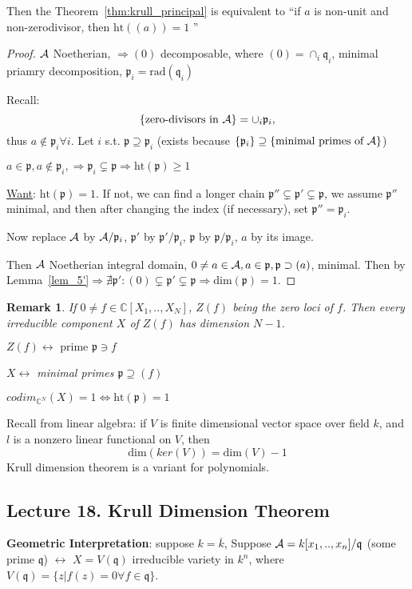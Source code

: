 \documentclass[11pt]{article}
\newtheorem{rmk}[thm]{Remark}
\newcommand{\cplx}{\mathbb C}
\newcommand{\scp}{{\mathfrak p}}
\newcommand{\scq}{\mathfrak q}
\newcommand{\cala}{{\cal A}}
\newcommand{\Lrta}{\Longrightarrow}
\newcommand{\llrta}{\longleftrightarrow}
\newcommand{\Llrta}{\Longleftrightarrow}
\begin{document}
Then the Theorem~\ref{thm:krull_principal} is equivalent to 
``if $a$ is non-unit and non-zerodivisor, then $\text{ht}((a))=1$ ''
\begin{proof}
$\cala$ Noetherian, $\Lrta (0)$ decomposable, where $(0)=\cap_i\scq_i$, minimal priamry decomposition, $\scp_i=\text{rad}(\scq_i)$

Recall:
$$
\{\text{zero-divisors in }\cala\} =\cup_i\scp_i,
$$
thus $a\notin\scp_i\forall i$. Let $i$ s.t. $\scp\supseteq \scp_i$ (exists because $\{\scp_i\}\supseteq \{\text{minimal primes of $\cala$}\}$)

$a\in\scp ,a\notin \scp_i,\Lrta\scp_i\subsetneq \scp\Lrta \text{ht}(\scp)\geq 1$

\underline{Want}: $\text{ht}(\scp)=1$. If not, we can find a longer chain $\scp''\subsetneq \scp'\subsetneq \scp$, we assume $\scp''$ minimal, and then after changing the index (if necessary), set $\scp''=\scp_i$.

Now replace
$\cala$ by $\cala/\scp_i$, $\scp'$ by $\scp'/\scp_i$, $\scp$ by $\scp/\scp_i$, $a$ by its image.

Then $\cala$ Noetherian integral domain, $0\neq a\in \cala,a\in\scp,\scp\supset(a)$, minimal.
Then by Lemma~\ref{lem_5'}$\Lrta \nexists \scp':(0)\subsetneq \scp'\subsetneq \scp\Lrta \text{dim}(\scp)=1$.
\end{proof}

\begin{rmk}
If $0\neq f\in\cplx[X_1,..,X_N]$, $Z(f)$ being the zero loci of $f$. Then every irreducible component $X$ of $Z(f)$ has dimension $N-1$.

$Z(f)\llrta\text{ prime }\scp\ni f$

$X\llrta $ minimal primes $\scp\supseteq (f)$ 

$codim_{\cplx^N}(X)=1\Llrta \text{ht}(\scp)=1$
\end{rmk}

Recall from linear algebra:
if $V$ is finite dimensional vector space over field $k$, and $l$ is a nonzero linear functional on $V$, then
$$
\text{dim}(ker(V))=\text{dim}(V)-1
$$
Krull dimension theorem is a variant for polynomials.



\subsection{Lecture 18. Krull Dimension Theorem}

\textbf{Geometric Interpretation}: suppose $k=\overline{k}$,
Suppose $\cala=k[x_1,..,x_n]/\scq$ (some prime $\scq$) $\llrta$ $X=V(\scq)$ irreducible variety in $k^n$, where $V(\scq)=\{z|f(z)=0\forall f\in\scq\}$.
\end{document}
